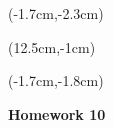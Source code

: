 \documentclass[12pt, oneside]{article}
\begin{document}
\begin{textblock*}{4cm}(-1.7cm,-2.3cm)
\end{textblock*}

\begin{textblock*}{8cm}(12.5cm,-1cm)
\end{textblock*}
\begin{textblock*}{13.5cm}(-1.7cm,-1.8cm)
\end{textblock*}

\vspace{1cm}

\begin{center}
\textbf{\Large Homework 10}
\end{center}
\end{document}
